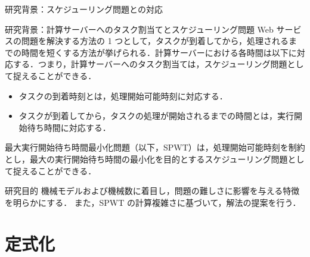 \documentclass[dvipdfmx]{beamer}
\begin{document}
\begin{frame}{研究背景：スケジューリング問題との対応}
  \begin{block}{研究背景：計算サーバーへのタスク割当てとスケジューリング問題}
    Web サービスの問題を解決する方法の 1 つとして，\alert{タスクが到着してから，処理されるまでの時間を短くする}方法が挙げられる．計算サーバーにおける各時間は以下に対応する．つまり，計算サーバーへのタスク割当ては，スケジューリング問題として捉えることができる．
    \begin{itemize}
      \item タスクの到着時刻とは，\alert{処理開始可能時刻}に対応する．
      \item タスクが到着してから，タスクの処理が開始されるまでの時間とは，\alert{実行開始待ち時間}に対応する．
    \end{itemize}
    最大実行開始待ち時間最小化問題（以下，SPWT）は，処理開始可能時刻を制約とし，最大の実行開始待ち時間の最小化を目的とするスケジューリング問題として捉えることができる．
  \end{block}

  \begin{block}{研究目的}
    機械モデルおよび機械数に着目し，問題の難しさに影響を与える特徴を明らかにする．
    また，SPWT の計算複雑さに基づいて，解法の提案を行う．
  \end{block}

\end{frame}
%
%
\section{定式化}
\end{document}

